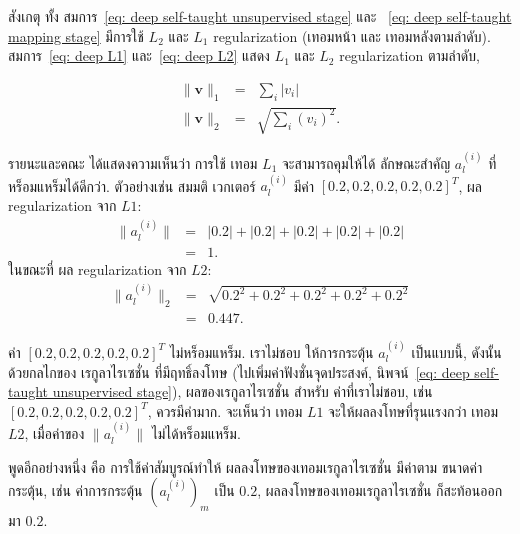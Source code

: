 สังเกตุ ทั้ง สมการ~\ref{eq: deep self-taught unsupervised stage} และ ~\ref{eq: deep self-taught mapping stage} มีการใช้ $L_2$ และ $L_1$ regularization (เทอมหน้า และ เทอมหลังตามลำดับ).
สมการ~\ref{eq: deep L1} และ~\ref{eq: deep L2} แสดง $L_1$ และ $L_2$ regularization ตามลำดับ,

\begin{eqnarray}
 \| \mathbf{v} \|_1 &=& \sum_i |v_i|
\label{eq: deep L1} \\
 \| \mathbf{v} \|_2 &=& \sqrt{ \sum_i (v_i)^2 }
\label{eq: deep L2}.
\end{eqnarray}

รายนะและคณะ ได้แสดงความเห็นว่า การใช้ เทอม $L_1$ จะสามารถคุมให้ได้ ลักษณะสำคัญ $a_l^{(i)}$ ที่หร็อมแหร็มได้ดีกว่า.
ตัวอย่างเช่น สมมติ เวกเตอร์ $a_l^{(i)}$ มีค่า $[0.2, 0.2, 0.2, 0.2, 0.2]^T$, 
ผล regularization จาก $L1$: 
\begin{eqnarray}
\| a_l^{(i)} \| &=& |0.2| + |0.2| + |0.2| + |0.2| + |0.2|
\nonumber \\
  &=& 1
\nonumber .
\end{eqnarray}
ในขณะที่ ผล regularization จาก $L2$:
\begin{eqnarray}
\| a_l^{(i)} \|_2 &=& \sqrt{0.2^2 + 0.2^2 + 0.2^2 + 0.2^2 + 0.2^2}
\nonumber \\
  &=& 0.447
\nonumber .
\end{eqnarray}

ค่า $[0.2, 0.2, 0.2, 0.2, 0.2]^T$ ไม่หร็อมแหร็ม.
เราไม่ชอบ ให้การกระตุ้น $a_l^{(i)}$ เป็นแบบนี้,
ดังนั้น ด้วยกลไกของ เรกูลาไรเซชั่น ที่มีฤทธิ์ลงโทษ (ไปเพิ่มค่าฟังชั่นจุดประสงค์, นิพจน์~\ref{eq: deep self-taught unsupervised stage}),
ผลของเรกูลาไรเซชั่น สำหรับ ค่าที่เราไม่ชอบ, เช่น $[0.2, 0.2, 0.2, 0.2, 0.2]^T$, ควรมีค่ามาก.
จะเห็นว่า เทอม $L1$ จะให้ผลลงโทษที่รุนแรงกว่า เทอม $L2$,
เมื่อค่าของ $\| a_l^{(i)} \|$ ไม่ได้หร็อมแหร็ม.

พูดอีกอย่างหนึ่ง คือ การใช้ค่าสัมบูรณ์ทำให้ ผลลงโทษของเทอมเรกูลาไรเซชั่น มีค่าตาม ขนาดค่ากระตุ้น, 
เช่น ค่าการกระตุ้น $(a_l^{(i)})_m$ เป็น $0.2$, ผลลงโทษของเทอมเรกูลาไรเซชั่น ก็สะท้อนออกมา $0.2$.

